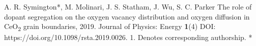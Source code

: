 \begin{cvpubys}
  \cvpuby
    {A. R. Symington*, M. Molinari, J. S. Statham, J. Wu, S. C. Parker}
    {The role of dopant segregation on the oxygen vacancy distribution and oxygen diffusion in CeO\textsubscript{2} grain boundaries,}
    {2019.}
    {Journal of Physics: Energy}
    {\textbf{1}(4)}
    {DOI: https://doi.org/10.1098/rsta.2019.0026.}
    {1.}
  \cvpuby
    {Denotes corresponding authorship.}
    {}
    {}
    {}
    {}
    {}
    {*}
\end{cvpubys}
